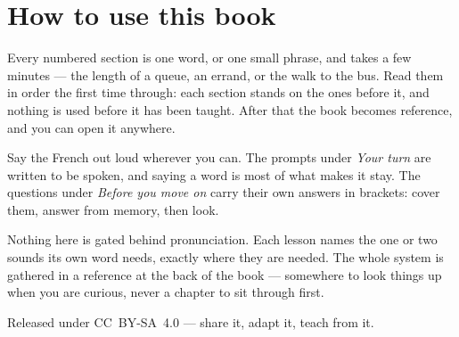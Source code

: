 \documentclass[11pt,twoside]{book}
\begin{document}
\section*{How to use this book}

Every numbered section is one word, or one small phrase, and takes a few
minutes --- the length of a queue, an errand, or the walk to the bus. Read them
in order the first time through: each section stands on the ones before it, and
nothing is used before it has been taught. After that the book becomes
reference, and you can open it anywhere.

Say the French out loud wherever you can. The prompts under \emph{Your turn}
are written to be spoken, and saying a word is most of what makes it stay. The
questions under \emph{Before you move on} carry their own answers in brackets:
cover them, answer from memory, then look.

Nothing here is gated behind pronunciation. Each lesson names the one or two
sounds its own word needs, exactly where they are needed. The whole system is
gathered in a reference at the back of the book --- somewhere to look things up
when you are curious, never a chapter to sit through first.

Released under CC~BY-SA~4.0 --- share it, adapt it, teach from it.

\tableofcontents

\mainmatter





































\backmatter






\end{document}
